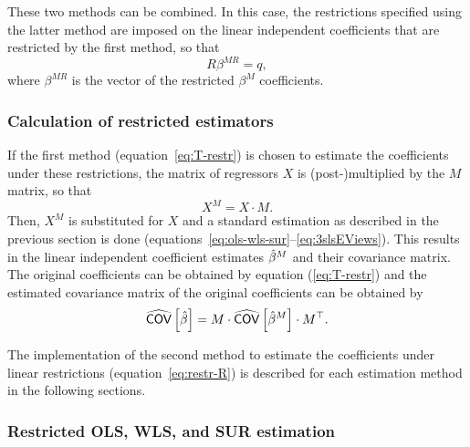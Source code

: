 These two methods can be combined.
In this case, the restrictions specified using the latter method are
imposed on the linear independent coefficients
that are restricted by the first method, so that
\begin{equation}
   R \beta^{MR} = q ,
\end{equation}
where $\beta^{MR}$ is the vector of the restricted $\beta^M$ coefficients.


\subsubsection{Calculation of restricted estimators}

If the first method (equation~\ref{eq:T-restr}) is chosen
to estimate the coefficients under these restrictions,
the matrix of regressors $X$ is (post-)\hspace{0pt}multiplied
by the $M$ matrix,
so that
\begin{equation}
    X^M = X \cdot M .
\end{equation}
Then, $X^M$ is substituted for $X$ and a standard estimation as described
in the previous section is done
(equations~\ref{eq:ols-wls-sur}--\ref{eq:3slsEViews}).
This results in the linear independent coefficient estimates $\hat{\beta}^M$ and
their covariance matrix.
The original coefficients can be obtained by equation (\ref{eq:T-restr})
and the estimated covariance matrix of the original coefficients
can be obtained by
\begin{equation}
   \widehat{\mathsf{COV}} \left[ \hat{\beta} \right]
   = M \cdot \widehat{\mathsf{COV}} \left[ \hat{\beta}^M \right] \cdot M^\top .
\end{equation}

The implementation of the second method to estimate the coefficients
under linear restrictions (equation~\ref{eq:restr-R})
is described for each estimation method in the following sections.


\subsubsection{Restricted OLS, WLS, and SUR estimation}

